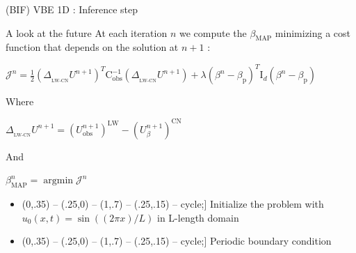 \documentclass[10pt,
			   xcolor=svgnames,
			   hyperref={linkcolor=red, citecolor = DarkGreen, colorlinks=true, urlcolor=Navy}] {beamer}
\def\checkmark{\tikz\fill[scale=0.4](0,.35) -- (.25,0) -- (1,.7) -- (.25,.15) -- cycle;}
\newcommand{\argmin}{\mathop{\mathrm{argmin}}}
\newcommand{\bepar}[1]{
	\left( #1 \right)  
}
\begin{document}
\begin{frame}{(BIF) VBE 1D : Inference step}
	\begin{block}{A look at the future}
		At each iteration $n$ we compute the $\beta_{\text{MAP}}$ minimizing a cost function that depends on the solution at $n+1$ : \\ 
		\begin{center}
			$\displaystyle \mathcal{J}^n = \frac{1}{2} \bepar{\Delta_{_{\text{LW-CN}}}U^{n+1}}^T \text{C}_\text{obs}^{-1} \bepar{\Delta_{_{\text{LW-CN}}}U^{n+1}} + \lambda \bepar{\beta^n -
			\beta_{\text{p}}}^T \text{I}_d \bepar{\beta^n - \beta_\text{p}}$
		\end{center}
		Where \begin{center}$\Delta_{_{\text{LW-CN}}}U^{n+1} = \bepar{U^{n+1}_{\text{obs}}}^\text{LW} - \bepar{U^{n+1}_\beta}^\text{CN}$ \end{center}
		And \\
		\begin{center}
			$\displaystyle \beta_{\text{MAP}}^n = \argmin \mathcal{J}^n$
		\end{center}
	\end{block}
	
	\begin{itemize}
		\item[\checkmark] Initialize the problem with $u_0(x,t) = \sin((2\pi x)/L)$ in L-length domain
		\item[\checkmark] Periodic boundary condition
	\end{itemize} 
\end{frame}
\end{document}
